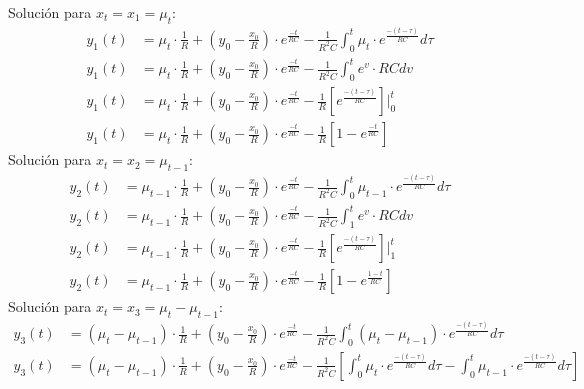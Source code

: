 \documentclass[12pt,a4paper]{report}
\begin{document}
\begin{enumerate}[label=\alph*)]
      Solución para $x_t = x_1 = \mu_t$:
      \begin{align*}
        y_1(t) &= \mu_t \cdot \frac{1}{R} + \left(y_0 - \frac{x_0}{R}\right) \cdot
          e^{\frac{-t}{RC}} - \frac{1}{R^2C} \int_{0}^{t} \mu_t \cdot e^{\frac{-(t-\tau)}{RC}} d\tau\\[6pt]
        y_1(t) &= \mu_t \cdot \frac{1}{R} + \left(y_0 - \frac{x_0}{R}\right) \cdot e^{\frac{-t}{RC}} -
          \frac{1}{R^2C} \int_{0}^{t} e^v \cdot RCdv\\[6pt]
        y_1(t) &= \mu_t \cdot \frac{1}{R} + \left(y_0 - \frac{x_0}{R}\right) \cdot e^{\frac{-t}{RC}} -
          \frac{1}{R} \left[e^{\frac{-(t-\tau)}{RC}}\right]\Big|_{0}^{t}\\[6pt]
        y_1(t) &= \mu_t \cdot \frac{1}{R} + \left(y_0 - \frac{x_0}{R}\right) \cdot e^{\frac{-t}{RC}} - \frac{1}{R}
          \left[1 - e^{\frac{-t}{RC}}\right]
      \end{align*}
      Solución para $x_t = x_2 = \mu_{t-1}$:
      \begin{align*}
        y_2(t) &= \mu_{t-1} \cdot \frac{1}{R} + \left(y_0 - \frac{x_0}{R}\right) \cdot
          e^{\frac{-t}{RC}} - \frac{1}{R^2C} \int_{0}^{t} \mu_{t-1} \cdot e^{\frac{-(t-\tau)}{RC}} d\tau\\[6pt]
        y_2(t) &= \mu_{t-1} \cdot \frac{1}{R} + \left(y_0 - \frac{x_0}{R}\right) \cdot e^{\frac{-t}{RC}} -
          \frac{1}{R^2C} \int_{1}^{t} e^v \cdot RCdv\\[6pt]
        y_2(t) &= \mu_{t-1} \cdot \frac{1}{R} + \left(y_0 - \frac{x_0}{R}\right) \cdot e^{\frac{-t}{RC}} -
          \frac{1}{R} \left[e^{\frac{-(t-\tau)}{RC}}\right]\Big|_{1}^{t}\\[6pt]
        y_2(t) &= \mu_{t-1} \cdot \frac{1}{R} + \left(y_0 - \frac{x_0}{R}\right) \cdot e^{\frac{-t}{RC}} -
          \frac{1}{R} \left[1 - e^{\frac{1-t}{RC}}\right]
      \end{align*}
      Solución para $x_t = x_3 = \mu_t - \mu_{t-1}$:
      \begin{align*}
        y_3(t) &= (\mu_t - \mu_{t-1}) \cdot \frac{1}{R} + \left(y_0 - \frac{x_0}{R}\right) \cdot e^{\frac{-t}{RC}} -
          \frac{1}{R^2C} \int_{0}^{t} (\mu_t - \mu_{t-1}) \cdot e^{\frac{-(t-\tau)}{RC}} d\tau\\[6pt]
        y_3(t) &= (\mu_t - \mu_{t-1}) \cdot \frac{1}{R} + \left(y_0 - \frac{x_0}{R}\right) \cdot e^{\frac{-t}{RC}} -
          \frac{1}{R^2C} \left[\int_{0}^{t} \mu_t \cdot e^{\frac{-(t-\tau)}{RC}} d\tau -
          \int_{0}^{t} \mu_{t-1} \cdot e^{\frac{-(t-\tau)}{RC}} d\tau \right]\\[6pt]

\end{align*}
\end{enumerate}
\end{document}
